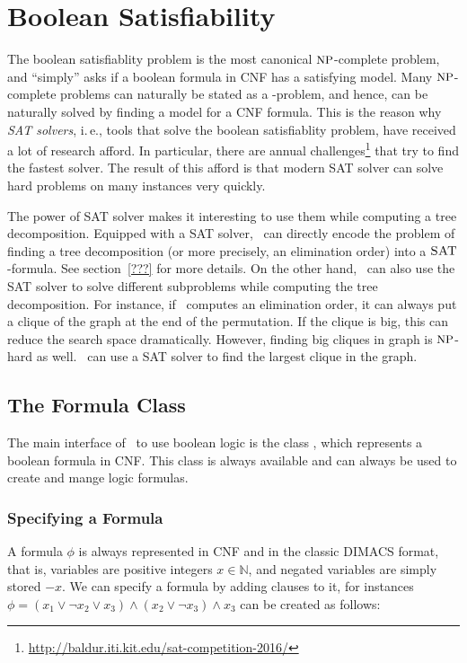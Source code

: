 \documentclass[a4paper, ukenglish, twoside, openright]{jdrasilmanual}
\begin{document}
\chapter{Boolean Satisfiability}
The boolean satisfiablity problem  is the most canonical
$\Class{NP}$-complete problem, and ``simply'' asks if a boolean
formula in CNF has a satisfying model. Many $\Class{NP}$-complete
problems can naturally be stated as a -problem, and hence, can
be naturally solved by finding a model for a CNF formula. This is the
reason why \emph{SAT solvers}, i.\,e., tools that solve the boolean
satisfiablity problem, have received a lot of research afford. In
particular, there are annual challenges\footnote{\url{http://baldur.iti.kit.edu/sat-competition-2016/}} that try to
find the fastest solver. The result of this afford is that modern
SAT solver can solve hard problems on many instances very quickly.

The power of SAT solver makes it interesting to use them while
computing a tree decomposition. Equipped with a SAT solver, \Jdrasil\
can directly encode the problem of finding a tree decomposition (or
more precisely, an elimination order) into a $\Lang{SAT}$-formula. See
section~\ref{???} for more details. On the other hand, \Jdrasil\ can
also use the SAT solver to solve different subproblems while computing
the tree decomposition. For instance, if \Jdrasil\ computes an
elimination order, it can always put a clique of the graph at the
end of the permutation. If the clique is big, this can reduce the
search space dramatically. However, finding big cliques in graph is
$\Class{NP}$-hard as well. \Jdrasil\ can use a SAT solver to find the
largest clique in the graph.

\section{The Formula Class}\label{section:satFormula}
The main interface of \Jdrasil\ to use boolean logic is the class
\JClass{jdrasil.sat.Formula}, which represents a boolean formula in
CNF. This class is always available and can always be used to create
and mange logic formulas. 

\subsection{Specifying a Formula}
A formula $\phi$ is always represented in CNF and in the classic
DIMACS format, that is, variables are positive integers
$x\in\mathbb{N}$, and negated variables are simply stored $-x$. We
can specify a formula by adding clauses to it, for instances
$\phi=(x_1\vee\neg x_2\vee x_3)\wedge(x_2\vee\neg x_3)\wedge x_3$ can
be created as follows:
\end{document}

